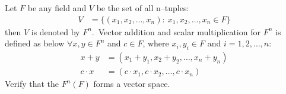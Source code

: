 \documentclass[12pt]{ipu-math}
\begin{document}

    \example
    Let $F$ be any field and $V$ be the set of all n--tuples:
    \begin{align*}
        V &= \{(x_1, x_2, \ldots, x_n): ~x_1, x_2, \ldots, x_n \in F\}
    \end{align*}
    then $V$ is denoted by $F^n$.\ Vector addition and scalar multiplication for $F^n$ is defined as below
    $\forall x,y \in F^n$ and $c \in F$, where $x_i, y_i \in F$ and $i = 1, 2, \ldots, n$:
    \begin{align*}
        x + y &= (x_1 + y_1, x_2 + y_2, \ldots, x_n + y_n)\\
        c \cdot x &= (c \cdot x_1, c \cdot x_2, \ldots, c \cdot x_n)
    \end{align*}
    Verify that the $F^n(F)$ forms a vector space.

    \\~
\end{document}
